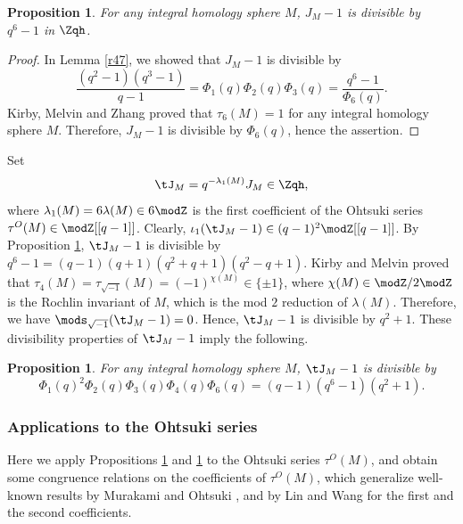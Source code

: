\documentclass{amsart}
\numberwithin{equation}{section}
\numberwithin{figure}{section}
\theoremstyle{plain}
\newtheorem{proposition}[theorem]{Proposition}
\theoremstyle{definition}
\theoremstyle{remark}
\begin{document}
\begin{proposition}
  \label{thm:44}
  For any integral homology sphere $M$, $J_M-1$ is divisible by
  $q^6-1$ in $\Zqh$.
\end{proposition}

\begin{proof}
  In Lemma \ref{r47}, we showed that $J_M-1$ is divisible by
  \begin{equation*}
    \frac{(q^2-1)(q^3-1)}{q-1}
    =\Phi _1(q)\Phi _2(q)\Phi _3(q)
    =\frac{q^6-1}{\Phi _6(q)}.
  \end{equation*}
  Kirby, Melvin and Zhang \cite{Kirby-Melvin-Zhang} proved that
  $\tau _6(M)=1$ for any integral homology sphere $M$.  Therefore, $J_M-1$
  is divisible by $\Phi _6(q)$, hence the assertion.
\end{proof}

Set
\begin{equation*}
  \tJ_M = q^{-\lambda _1(M)}J_M\in \Zqh,
\end{equation*}
where $\lambda _1(M)=6\lambda (M)\in 6\modZ $ is the first coefficient of the Ohtsuki
series $\tau ^O(M)\in \modZ [[q-1]]$.  Clearly,
$\iota _1(\tJ_M-1)\in (q-1)^2\modZ [[q-1]]$.  By Proposition \ref{thm:44},
$\tJ_M-1$ is divisible by $q^6-1=(q-1)(q+1)(q^2+q+1)(q^2-q+1)$.  Kirby
and Melvin \cite{Kirby-Melvin} proved that
$\tau _4(M)=\tau _{\sqrt{-1}}(M)=(-1)^{\chi (M)}\in \{\pm 1\}$, where
$\chi (M)\in \modZ /2\modZ $ is the Rochlin invariant of $M$, which is the mod $2$
reduction of $\lambda (M)$.  Therefore, we have $\mods _{\sqrt{-1}}(\tJ_M-1)=0$.
Hence, $\tJ_M-1$ is divisible by $q^2+1$.  These divisibility
properties of $\tJ_M-1$ imply the following.

\begin{proposition}
  \label{r10}
  For any integral homology sphere $M$, $\tJ_M-1$ is divisible by
  \begin{equation*}
    \Phi _1(q)^2\Phi _2(q)\Phi _3(q)\Phi _4(q)\Phi _6(q)
    =(q-1)(q^6-1)(q^2+1).
  \end{equation*}
\end{proposition}

\subsubsection{Applications to the Ohtsuki series}
\label{sec:appl-ohts-seri}

Here we apply Propositions \ref{thm:44} and \ref{r10} to the Ohtsuki
series $\tau ^O(M)$, and obtain some congruence relations on the
coefficients of $\tau ^O(M)$, which generalize well-known results by
Murakami \cite{Murakami1} and Ohtsuki \cite{Ohtsuki1}, and by Lin and
Wang \cite{Lin-Wang,Lin-Wang2} for the first and the second
coefficients.
\end{document}
